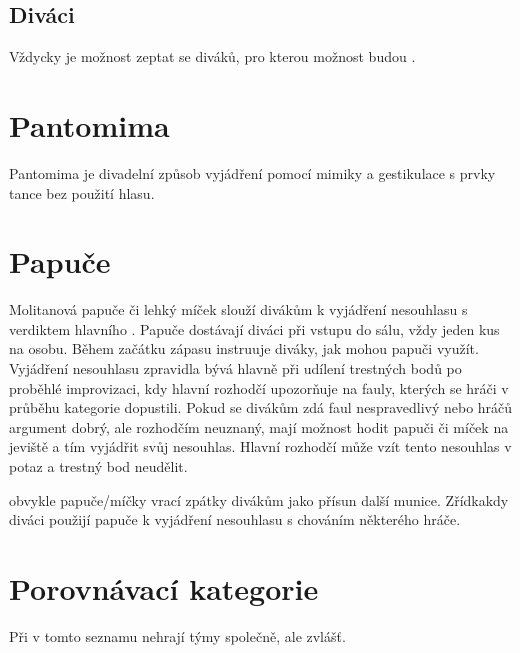 \subsection{ Diváci } Vždycky je možnost zeptat se diváků, pro kterou možnost budou . 
 
 
 
\needspace{5cm} \section{Pantomima} \label{pantomima} Pantomima je divadelní způsob vyjádření pomocí mimiky a gestikulace s prvky tance bez použití hlasu.  
 
 
 
\needspace{5cm} \section{Papuče} \label{papuče} Molitanová papuče či lehký míček slouží divákům k vyjádření nesouhlasu s verdiktem hlavního . Papuče dostávají diváci při vstupu do sálu, vždy jeden kus na osobu. Během začátku zápasu instruuje  diváky, jak mohou papuči využít. Vyjádření nesouhlasu zpravidla bývá hlavně při udílení trestných bodů po proběhlé improvizaci, kdy hlavní rozhodčí upozorňuje na fauly, kterých se hráči v průběhu kategorie dopustili. Pokud se divákům zdá faul nespravedlivý nebo hráčů argument dobrý, ale rozhodčím neuznaný, mají možnost hodit papuči či míček na jeviště a tím vyjádřit svůj nesouhlas. Hlavní rozhodčí může vzít tento nesouhlas v potaz a trestný bod neudělit. 
 
 obvykle papuče/míčky vrací zpátky divákům jako  přísun další munice.  
Zřídkakdy diváci použijí papuče k vyjádření nesouhlasu s chováním některého hráče. 
 
 
\needspace{5cm} \section{Porovnávací kategorie} \label{porovnávací kategorie} Při  v tomto seznamu nehrají týmy společně, ale zvlášť. 
 
